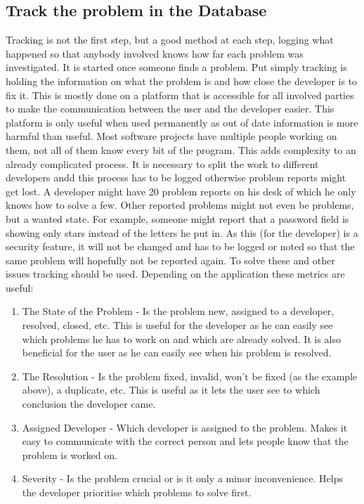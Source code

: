 \subsection{Track the problem in the Database}
\label{aodZellerTrack}
Tracking is not the first step, but a good method at each step, logging what happened so that anybody involved knows how far each problem was investigated. It is started once someone finds a problem. Put simply tracking is holding the information on what the problem is and how close the developer is to fix it. This is mostly done on a platform that is accessible for all involved parties to make the communication between the user and the developer easier. This platform is only useful when used permanently as out of date information is more harmful than useful. Most software projects have multiple people working on them, not all of them know every bit of the program. This adds complexity to an already complicated process. It is necessary to split the work to different developers andd this process has to be logged otherwise problem reports might get lost. A developer might have 20 problem reports on his desk of which he only knows how to solve a few. Other reported problems might not even be problems, but a wanted state. For example, someone might report that a password field is showing only stars instead of the letters he put in. As this (for the developer) is a security feature, it will not be changed and has to be logged or noted so that the same problem will hopefully not be reported again. To solve these and other issues tracking should be used. Depending on the application these metrics are useful:
\begin{enumerate}
  \item The State of the Problem - Is the problem new, assigned to a developer,
resolved, closed, etc. This is useful for the developer as he can easily see which problems he has to work on and which are already solved. It is also beneficial for the user as he can easily see when his problem is resolved.
  \item The Resolution - Is the problem fixed, invalid, won't be fixed (as the example above), a duplicate, etc. This is useful as it lets the user see to which conclusion the developer came.
  \item Assigned Developer -  Which developer is assigned to the problem. Makes it easy to communicate with the correct person and lets people know that the problem is worked on.
  \item Severity - Is the problem crucial or is it only a minor inconvenience. Helps the developer prioritise which problems to solve first.
\end{enumerate}


